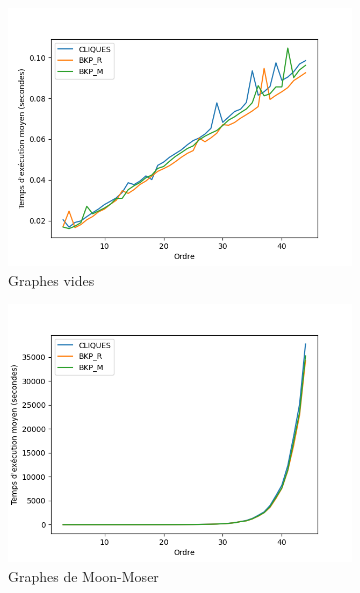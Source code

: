 \documentclass[12pt,a4paper]{article}
\begin{document}
\begin{figure}[ht]
  \centering
  \begin{subfigure}[b]{0.42\textwidth}
    \includegraphics[width=\textwidth]{images/total_pivot_empty_plot.png}
    \caption{Graphes vides}
    \label{subfig:total_empty}
  \end{subfigure}
  \begin{subfigure}[b]{0.42\textwidth}
    \includegraphics[width=\textwidth]{images/total_pivot_turan_plot.png}
    \caption{Graphes de Moon-Moser}
    \label{subfig:total_turan}
  \end{subfigure}
  \begin{subfigure}[b]{0.42\textwidth}

\end{subfigure}
\end{figure}
\end{document}
